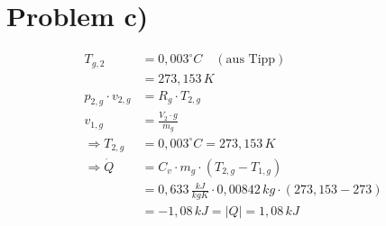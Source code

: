\section*{Problem c)}

\begin{align*}
    T_{g,2} &= 0{,}003^\circ C \quad (\text{aus Tipp}) \\
    &= 273{,}153 \, K \\
    p_{2,g} \cdot v_{2,g} &= R_g \cdot T_{2,g} \\
    v_{1,g} &= \frac{V_2 \cdot g}{m_g} \\
    \Rightarrow T_{2,g} &= 0{,}003^\circ C = 273{,}153 \, K \\
    \Rightarrow \dot{Q} &= C_v \cdot m_g \cdot (T_{2,g} - T_{1,g}) \\
    &= 0{,}633 \, \frac{kJ}{kgK} \cdot 0{,}00842 \, kg \cdot (273{,}153 - 273) \\
    &= -1{,}08 \, kJ = |Q| = 1{,}08 \, kJ
\end{align*}